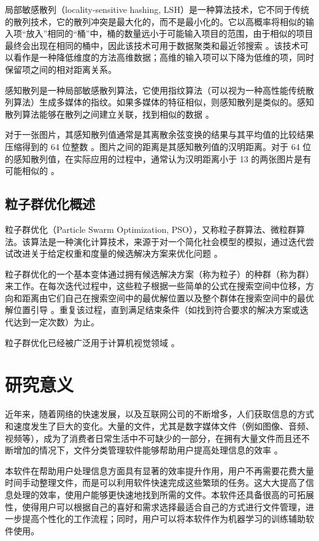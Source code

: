 局部敏感散列（locality-sensitive hashing, LSH）是一种算法技术，它不同于传统的散列技术，它的散列冲突是最大化的，而不是最小化的。它以高概率将相似的输入项“放入”相同的“桶”中，桶的数量远小于可能输入项目的范围，由于相似的项目最终会出现在相同的桶中，因此该技术可用于数据聚类和最近邻搜索 \cite{mmds}。该技术可以看作是一种降低维度的方法高维数据；高维的输入项可以下降为低维的项，同时保留项之间的相对距离关系。

感知散列是一种局部敏感散列算法，它使用指纹算法（可以视为一种高性能传统散列算法）生成多媒体的指纹。如果多媒体的特征相似，则感知散列是类似的。感知散列算法能够在散列之间建立关联，找到相似的数据 \cite{phash1}。

对于一张图片，其感知散列值通常是其离散余弦变换的结果与其平均值的比较结果压缩得到的 64 位整数 \cite{phash2}。图片之间的距离是其感知散列值的汉明距离。对于 64 位的感知散列值，在实际应用的过程中，通常认为汉明距离小于 13 的两张图片是有可能相似的 \cite{phash3}。

\subsection{粒子群优化概述}

粒子群优化（Particle Swarm Optimization, PSO），又称粒子群算法、微粒群算法。该算法是一种演化计算技术，来源于对一个简化社会模型的模拟，通过迭代尝试改进关于给定权重和度量的候选解决方案来优化问题 \cite{pso}。

粒子群优化的一个基本变体通过拥有候选解决方案（称为粒子）的种群（称为群）来工作。在每次迭代过程中，这些粒子根据一些简单的公式在搜索空间中位移，方向和距离由它们自己在搜索空间中的最优解位置以及整个群体在搜索空间中的最优解位置引导 \cite{pso2}。重复该过程，直到满足结束条件（如找到符合要求的解决方案或迭代达到一定次数）为止。

粒子群优化已经被广泛用于计算机视觉领域 \cite{psoimg1} \cite{psoimg2} \cite{psoimg3}。

\section{研究意义}

近年来，随着网络的快速发展，以及互联网公司的不断增多，人们获取信息的方式和速度发生了巨大的变化。大量的文件，尤其是数字媒体文件（例如图像、音频、视频等），成为了消费者日常生活中不可缺少的一部分，在拥有大量文件而且还不断增加的情况下，文件分类管理软件能够帮助用户提高处理信息的效率 \cite{cn51}。

本软件在帮助用户处理信息方面具有显著的效率提升作用，用户不再需要花费大量时间手动整理文件，而是可以利用软件快速完成这些繁琐的任务。这大大提高了信息处理的效率，使用户能够更快速地找到所需的文件。本软件还具备很高的可拓展性，使得用户可以根据自己的喜好和需求选择最适合自己的方式进行文件管理，进一步提高个性化的工作流程；同时，用户可以将本软件作为机器学习的训练辅助软件使用。

